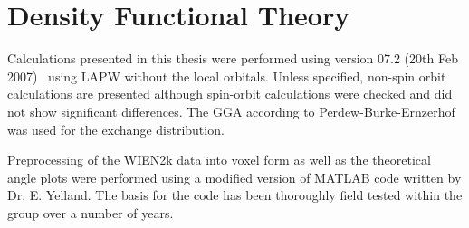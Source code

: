 
\section{Density Functional Theory}
\label{Sec:Exp:Dft}

Calculations presented in this thesis were performed using \WIEN version 07.2 (20th Feb 2007)~\cite{Blaha2001} using \ac{LAPW} without the local orbitals. Unless specified, non-spin orbit calculations are presented although spin-orbit calculations were checked and did not show significant differences. The \ac{GGA} according to Perdew-Burke-Ernzerhof~\cite{Perdew1996} was used for the exchange distribution.

Preprocessing of the WIEN2k data into voxel form as well as the theoretical angle plots were performed using a modified version of MATLAB code written by Dr. E. Yelland. The basis for the code has been thoroughly field tested within the group over a number of years.
